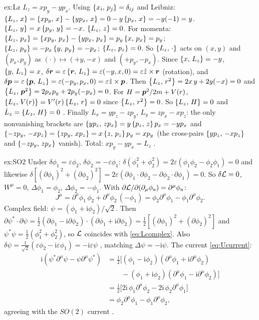 \documentclass[11pt]{article}
\newcommand{\eps}{\varepsilon}
\begin{document}
\begin{solution}{ex:Lz}
$L_z=xp_y-yp_x$. Using $\left\{x_i,\,p_j\right\}=\delta_{ij}$ and Leibniz: $\left\{L_z,\,x\right\}=\left\{xp_y,\,x\right\}-\left\{yp_x,\,x\right\}=0-y\left\{p_x,\,x\right\}=-y(-1)=y$. $\left\{L_z,\,y\right\}=x\left\{p_y,\,y\right\}=-x$. $\left\{L_z,\,z\right\}=0$. For momenta: $\left\{L_z,\,p_x\right\}=\left\{xp_y,\,p_x\right\}-\left\{yp_x,\,p_x\right\}=p_y\left\{x,\,p_x\right\}=p_y$; $\left\{L_z,\,p_y\right\}=-p_x\left\{y,\,p_y\right\}=-p_x$; $\left\{L_z,\,p_z\right\}=0$. So $\left\{L_z,\,\cdot\right\}$ acts on $(x,y)$ and $(p_x,p_y)$ as $(\cdot)\mapsto(+y,-x)$ and $(+p_y,-p_x)$. Since $\left\{x,\,L_z\right\}=-y$, $\left\{y,\,L_z\right\}=x$, $\delta\vect r=\eps\pb{\vect r}{L_z}=\eps(-y,x,0)=\eps\hat z\times\vect r$ \checkmark (rotation), and $\delta\vect p=\eps\pb{\vect p}{L_z}=\eps(-p_y,p_x,0)=\eps\hat z\times\vect p$. Then $\left\{L_z,\,r^2\right\}=2x\,y+2y(-x)=0$ and $\left\{L_z,\,\bm{p}^2\right\}=2p_xp_y+2p_y(-p_x)=0$. For $H=\bm{p}^2/2m+V(r)$, $\left\{L_z,\,V(r)\right\}=V'(r)\left\{L_z,\,r\right\}=0$ since $\left\{L_z,\,r^2\right\}=0$. So $\left\{L_z,\,H\right\}=0$ and $\dot L_z=\left\{L_z,\,H\right\}=0$ \checkmark. Finally $L_x=yp_z-zp_y$, $L_y=zp_x-xp_z$: the only nonvanishing brackets are $\left\{yp_z,\,zp_x\right\}=y\left\{p_z,\,z\right\}p_x=-yp_x$ and $\left\{-zp_y,\,-xp_z\right\}=\left\{zp_y,\,xp_z\right\}=x\left\{z,\,p_z\right\}p_y=xp_y$ (the cross-pairs $\left\{yp_z,\,-xp_z\right\}$ and $\left\{-zp_y,\,zp_x\right\}$ vanish). Total: $xp_y-yp_x=L_z$ \checkmark.
\end{solution}

\begin{solution}{ex:SO2}
Under $\delta\phi_1=\eps\phi_2$, $\delta\phi_2=-\eps\phi_1$: $\delta(\phi_1^2+\phi_2^2)=2\eps(\phi_1\phi_2-\phi_2\phi_1)=0$ and likewise $\delta[(\partial\phi_1)^2+(\partial\phi_2)^2]=2\eps(\partial\phi_1\cdot\partial\phi_2-\partial\phi_2\cdot\partial\phi_1)=0$. So $\delta\mathcal{L}=0$, $W^\mu=0$, $\Delta\phi_1=\phi_2$, $\Delta\phi_2=-\phi_1$. With $\partial\mathcal{L}/\partial(\partial_\mu\phi_a)=\partial^\mu\phi_a$:
\begin{equation}
  J^\mu=\partial^\mu\phi_1\,\phi_2+\partial^\mu\phi_2\,(-\phi_1)=\phi_2\partial^\mu\phi_1-\phi_1\partial^\mu\phi_2 .
\end{equation}
Complex field: $\psi=(\phi_1+\mathrm i\phi_2)/\sqrt2$. Then $\partial\psi^*\!\cdot\partial\psi=\tfrac12(\partial\phi_1-\mathrm i\partial\phi_2)\!\cdot\!(\partial\phi_1+\mathrm i\partial\phi_2)=\tfrac12[(\partial\phi_1)^2+(\partial\phi_2)^2]$ and $\psi^*\psi=\tfrac12(\phi_1^2+\phi_2^2)$, so $\mathcal{L}$ coincides with \eqref{eq:Lcomplex}. Also $\delta\psi=\tfrac1{\sqrt2}(\eps\phi_2-\mathrm i\eps\phi_1)=-\mathrm i\eps\psi$ \checkmark, matching $\Delta\psi=-\mathrm i\psi$. The current \eqref{eq:Ucurrent}:
\begin{align*}
  \mathrm i(\psi^*\partial^\mu\psi-\psi\partial^\mu\psi^*)
  &=\tfrac{\mathrm i}2\big[(\phi_1-\mathrm i\phi_2)(\partial^\mu\phi_1+\mathrm i\partial^\mu\phi_2)\\
  &\qquad-(\phi_1+\mathrm i\phi_2)(\partial^\mu\phi_1-\mathrm i\partial^\mu\phi_2)\big]\\
  &=\tfrac{\mathrm i}2\big[2\mathrm i\,\phi_1\partial^\mu\phi_2-2\mathrm i\,\phi_2\partial^\mu\phi_1\big]\\
  &=\phi_2\partial^\mu\phi_1-\phi_1\partial^\mu\phi_2,
\end{align*}
agreeing with the $SO(2)$ current \checkmark.
\end{solution}
\end{document}
